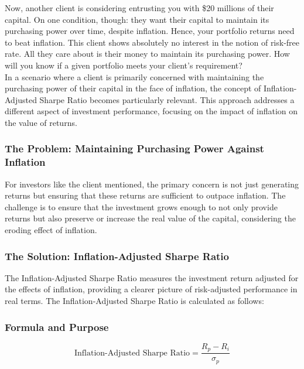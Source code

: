 \documentclass{article}
\begin{document}
Now, another client is considering entrusting you with \$20 millions of their capital. On one condition, though: they want their capital to maintain its purchasing power over time, despite inflation. Hence, your portfolio returns need to beat inflation. This client shows absolutely no interest in the notion of risk-free rate. All they care about is their money to maintain its purchasing power. How will you know if a given portfolio meets your client's requirement? \\

In a scenario where a client is primarily concerned with maintaining the purchasing power of their capital in the face of inflation, the concept of Inflation-Adjusted Sharpe Ratio becomes particularly relevant. This approach addresses a different aspect of investment performance, focusing on the impact of inflation on the value of returns. \\

\subsubsection{The Problem: Maintaining Purchasing Power Against Inflation}

For investors like the client mentioned, the primary concern is not just generating returns but ensuring that these returns are sufficient to outpace inflation. The challenge is to ensure that the investment grows enough to not only provide returns but also preserve or increase the real value of the capital, considering the eroding effect of inflation. \\

\subsubsection{The Solution: Inflation-Adjusted Sharpe Ratio}

The Inflation-Adjusted Sharpe Ratio measures the investment return adjusted for the effects of inflation, providing a clearer picture of risk-adjusted performance in real terms. The Inflation-Adjusted Sharpe Ratio is calculated as follows:

\subsubsection{Formula and Purpose}

\begin{equation}
    \text{Inflation-Adjusted Sharpe Ratio} = \frac{R_p - R_i}{\sigma_p}
\end{equation}
\end{document}
